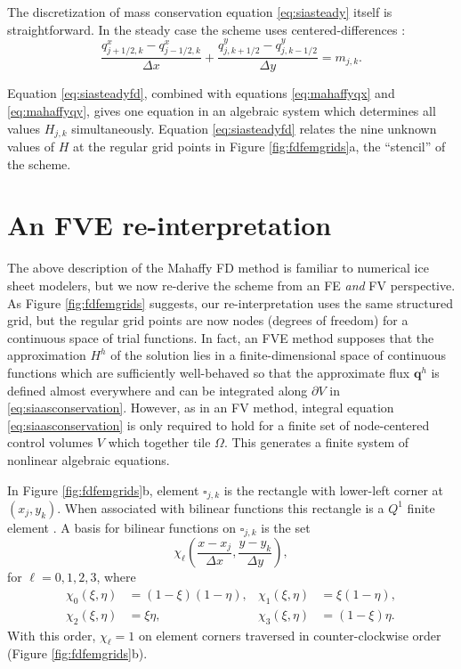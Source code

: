 \documentclass[twocolumn,letterpaper]{igs}
\newcommand\bq{\mathbf{q}}
\begin{document}
The discretization of mass conservation equation \eqref{eq:siasteady} itself is straightforward.  In the steady case the scheme uses centered-differences \citep{MortonMayers2005}:
\begin{equation}
\frac{q^x_{j+1/2,k} - q^x_{j-1/2,k}}{\Delta x} + \frac{q^y_{j,k+1/2}- q^y_{j,k-1/2}}{\Delta y} = m_{j,k}.  \label{eq:siasteadyfd}
\end{equation}

Equation \eqref{eq:siasteadyfd}, combined with equations \eqref{eq:mahaffyqx} and \eqref{eq:mahaffyqy}, gives one equation in an algebraic system which determines all values $H_{j,k}$ simultaneously.  Equation \eqref{eq:siasteadyfd} relates the nine unknown values of $H$ at the regular grid points in Figure \ref{fig:fdfemgrids}a, the ``stencil''  \citep{MortonMayers2005} of the scheme.


\section{An FVE re-interpretation} \label{sec:fveinterpretation}

The above description of the Mahaffy FD method is familiar to numerical ice sheet modelers, but we now re-derive the scheme from an FE \emph{and} FV perspective.  As Figure \ref{fig:fdfemgrids} suggests, our re-interpretation uses the same structured grid, but the regular grid points are now nodes (degrees of freedom) for a continuous space of trial functions.  In fact, an FVE method supposes that the approximation $H^h$ of the solution lies in a finite-dimensional space of continuous functions which are sufficiently well-behaved so that the approximate flux $\bq^h$ is defined almost everywhere and can be integrated along $\partial V$ in \eqref{eq:siaasconservation}.  However, as in an FV method, integral equation \eqref{eq:siaasconservation} is only required to hold for a finite set of node-centered control volumes $V$ which together tile $\Omega$.  This generates a finite system of nonlinear algebraic equations.

In Figure \ref{fig:fdfemgrids}b, element $\square_{j,k}$ is the rectangle with lower-left corner at $(x_j,y_k)$.  When associated with bilinear functions this rectangle is a $Q^1$ finite element \citep{Elmanetal2005}.  A basis for bilinear functions on $\square_{j,k}$ is the set
\begin{equation}
\chi_\ell \left(\frac{x-x_j}{\Delta x},\frac{y-y_k}{\Delta y}\right), \label{eq:elementbasis}
\end{equation}
for $\ell=0,1,2,3$, where
\begin{align*}
\chi_0(\xi,\eta) &= \left(1-\xi\right) \left(1-\eta\right), & \chi_1(\xi,\eta) &= \xi \left(1-\eta\right), \\
\chi_2(\xi,\eta) &= \xi \eta, & \chi_3(\xi,\eta) &= \left(1-\xi\right) \eta.
\end{align*}
With this order, $\chi_\ell=1$ on element corners traversed in counter-clockwise order (Figure \ref{fig:fdfemgrids}b).  
\end{document}
